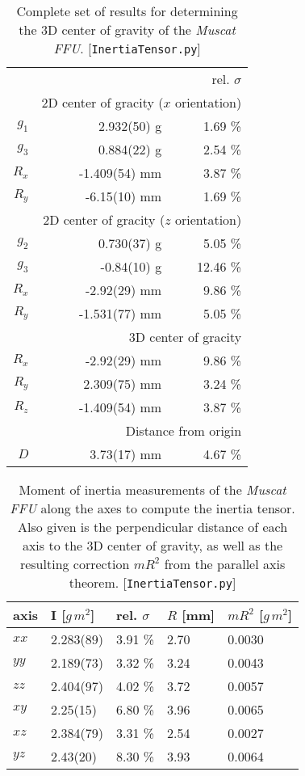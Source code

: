 \documentclass[journal]{IEEEtran}
\begin{document}
\begin{table}
	\centering
	\begin{tabular}{r | r r}
		\multicolumn{3}{r}{rel. $\sigma$} \\
		& \multicolumn{2}{r}{2D center of gracity ($x$ orientation)} \\
		\hline
		$g_{1}$	& 2.932(50) g	& 1.69 \% \\
		$g_{3}$	& 0.884(22) g	& 2.54 \% \\
		$R_x$	& -1.409(54) mm	& 3.87 \% \\
		$R_y$	& -6.15(10) mm	& 1.69 \% \\
		& \multicolumn{2}{r}{2D center of gracity ($z$ orientation)} \\
		\hline
		$g_2$	& 0.730(37) g	& 5.05 \% \\
		$g_3$	& -0.84(10) g	& 12.46 \% \\
		$R_x$	& -2.92(29) mm	& 9.86 \% \\
		$R_y$	& -1.531(77) mm	& 5.05 \% \\
		& \multicolumn{2}{r}{3D center of gracity} \\
		\hline
		$R_x$	& -2.92(29) mm	& 9.86 \% \\
		$R_y$	& 2.309(75) mm	& 3.24 \% \\
		$R_z$	& -1.409(54) mm	& 3.87 \% \\
		& \multicolumn{2}{r}{Distance from origin} \\
		\hline
		$D$	& 3.73(17) mm	& 4.67 \% \\
	\end{tabular}
	\caption{Complete set of results for determining the 3D center of gravity of the \emph{Muscat FFU}. [\texttt{InertiaTensor.py}]}
	\label{tab:FFUCoG}
\end{table}

\begin{table}
	\centering
	\begin{tabular}{l | l l l l}
		axis	& I [$\unit{g\,m^2}$]		& rel. $\sigma$ & $R$ [mm]		& $m R^2$ [$\unit{g\,m^2}$] \\
		\hline
		$xx$	& 2.283(89) & 3.91 \%	& 2.70	& 0.0030 \\
		$yy$	& 2.189(73) & 3.32 \% 	& 3.24	& 0.0043 \\
		$zz$	& 2.404(97) & 4.02 \% 	& 3.72	& 0.0057 \\
		$xy$	& 2.25(15) & 6.80 \% 	& 3.96	& 0.0065 \\
		$xz$	& 2.384(79) & 3.31 \%	& 2.54	& 0.0027 \\
		$yz$	& 2.43(20) & 8.30 \%	& 3.93	& 0.0064 \\
	\end{tabular}
	\caption{Moment of inertia measurements of the \emph{Muscat FFU} along the axes to compute the inertia tensor. Also given is the perpendicular distance of each axis to the 3D center of gravity, as well as the resulting correction $mR^2$ from the parallel axis theorem. [\texttt{InertiaTensor.py}]}
	\label{tab:FFUI}
\end{table}
\end{document}
